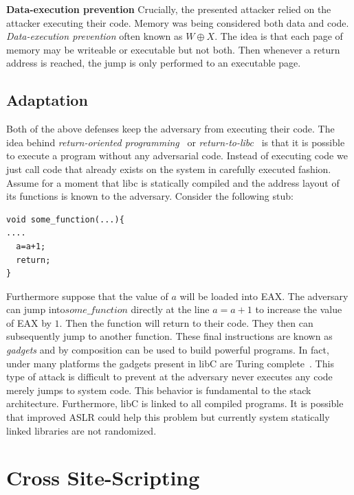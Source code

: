\documentclass{article}
\begin{document}
\textbf{Data-execution prevention}
Crucially, the presented attacker relied on the attacker executing their code.  Memory was being considered both data and code.  \emph{Data-execution prevention} often known as $W\oplus X$.  The idea is that each page of memory may be writeable or executable but not both.  Then whenever a return address is reached, the jump is only performed to an executable page.

\subsection{Adaptation}
Both of the above defenses keep the adversary from executing their code.  The idea behind \emph{return-oriented programming}~\cite{shachamROP} or \emph{return-to-libc}~\cite{shachamReturnLibC} is that it is possible to execute a program without any adversarial code.  Instead of executing code we just call code that already exists on the system in carefully executed fashion.  Assume for a moment that libc is statically compiled and the address layout of its functions is known to the adversary.  Consider the following stub:

\begin{lstlisting}
void some_function(...){
....
  a=a+1;
  return;
}
\end{lstlisting}

Furthermore suppose that the value of $a$ will be loaded into EAX.  The adversary can jump into$some\_function$ directly at the line $a=a+1$ to increase the value of EAX by $1$.  Then the function will return to their code.  They then can subsequently jump to another function.  These final instructions are known as \emph{gadgets} and by composition can be used to build powerful programs.  In fact, under many platforms the gadgets present in libC are Turing complete~\cite{shachamROPcomplete}.  This type of attack is difficult to prevent at the adversary never executes any code merely jumps to system code.  This behavior is fundamental to the stack architecture.  Furthermore, libC is linked to all compiled programs.  It is possible that improved ASLR could help this problem but currently system statically linked libraries are not randomized.
\section{Cross Site-Scripting}\label{sec:xss}
\end{document}
